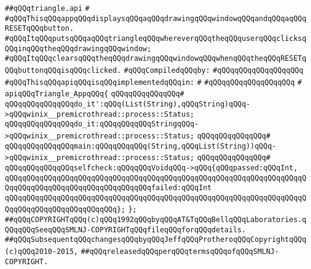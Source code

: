 \label{src/lib/x-kit/tut/triangle/triangle-app.api}
\verb|##qQQqtriangle.api|\newline
\verb|#|\newline
\verb|#qQQqThisqQQqappqQQqdisplaysqQQqaqQQqdrawingqQQqwindowqQQqandqQQqaqQQqRESETqQQqbutton.|\newline
\verb|#qQQqItqQQqputsqQQqaqQQqtriangleqQQqwhereverqQQqtheqQQquserqQQqclicksqQQqinqQQqtheqQQqdrawingqQQqwindow;|\newline
\verb|#qQQqItqQQqclearsqQQqtheqQQqdrawingqQQqwindowqQQqwhenqQQqtheqQQqRESETqQQqbuttonqQQqisqQQqclicked.|\newline
\newline
\verb|#qQQqCompiledqQQqby:|\newline
\verb|#qQQqqQQqqQQqqQQqqQQq|\newline
\newline
\verb|#qQQqThisqQQqapiqQQqisqQQqimplementedqQQqin:|\newline
\verb|#|\newline
\verb|#qQQqqQQqqQQqqQQqqQQq|\newline
\verb|#|\newline
\verb|apiqQQqTriangle_AppqQQq{|\newline
\verb|qQQqqQQqqQQqqQQq#|\newline
\verb|qQQqqQQqqQQqqQQqdo_it':qQQq(List(String),qQQqString)qQQq->qQQqwinix__premicrothread::process::Status;|\newline
\verb|qQQqqQQqqQQqqQQqdo_it:qQQqqQQqqQQqStringqQQq->qQQqwinix__premicrothread::process::Status;|\newline
\verb|qQQqqQQqqQQqqQQq#|\newline
\verb|qQQqqQQqqQQqqQQqmain:qQQqqQQqqQQq(String,qQQqList(String))qQQq->qQQqwinix__premicrothread::process::Status;|\newline
\verb|qQQqqQQqqQQqqQQq#|\newline
\verb|qQQqqQQqqQQqqQQqselfcheck:qQQqqQQqVoidqQQq->qQQq{qQQqpassed:qQQqInt,|\newline
\verb|qQQqqQQqqQQqqQQqqQQqqQQqqQQqqQQqqQQqqQQqqQQqqQQqqQQqqQQqqQQqqQQqqQQqqQQqqQQqqQQqqQQqqQQqqQQqqQQqqQQqqQQqfailed:qQQqInt|\newline
\verb|qQQqqQQqqQQqqQQqqQQqqQQqqQQqqQQqqQQqqQQqqQQqqQQqqQQqqQQqqQQqqQQqqQQqqQQqqQQqqQQqqQQqqQQqqQQqqQQq};|\newline
\verb|};|\newline
\newline
\newline
\verb|##qQQqCOPYRIGHTqQQq(c)qQQq1992qQQqbyqQQqAT&TqQQqBellqQQqLaboratories.qQQqqQQqSeeqQQqSMLNJ-COPYRIGHTqQQqfileqQQqforqQQqdetails.|\newline
\verb|##qQQqSubsequentqQQqchangesqQQqbyqQQqJeffqQQqProtheroqQQqCopyrightqQQq(c)qQQq2010-2015,|\newline
\verb|##qQQqreleasedqQQqperqQQqtermsqQQqofqQQqSMLNJ-COPYRIGHT.|\newline

